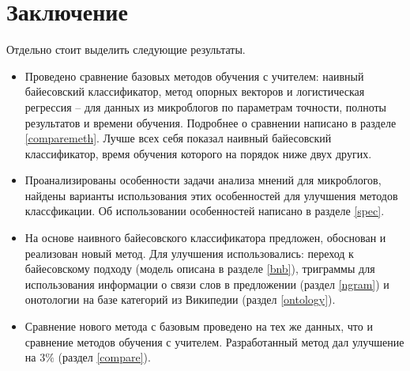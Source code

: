 \section*{Заключение}

Отдельно стоит выделить следующие результаты.
\begin{itemize}
\item Проведено сравнение базовых методов обучения с учителем: наивный байесовский классификатор,
  метод опорных векторов и логистическая регрессия --  для данных из микроблогов по
  параметрам точности, полноты результатов и времени обучения. Подробнее о сравнении написано в
  разделе \ref{comparemeth}. Лучше всех себя показал наивный байесовский классификатор, время
  обучения которого на порядок ниже двух других.
\item Проанализированы особенности задачи анализа мнений для микроблогов, найдены варианты
  использования этих особенностей для улучшения методов классфикации. Об использовании особенностей
  написано в разделе \ref{spec}.
\item На основе наивного байесовского классификатора предложен, обоснован и реализован новый
  метод. Для улучшения использовались: переход к байесовскому подходу (модель описана в разделе
  \ref{bnb}), триграммы для использования информации о связи слов в предложении (раздел \ref{ngram})
  и онотологии на базе категорий из Википедии (раздел \ref{ontology}).
\item Сравнение нового метода с базовым проведено на тех же данных, что и сравнение методов обучения
  с учителем. Разработанный метод дал улучшение на $3\%$ (раздел \ref{compare}).
\end{itemize}
